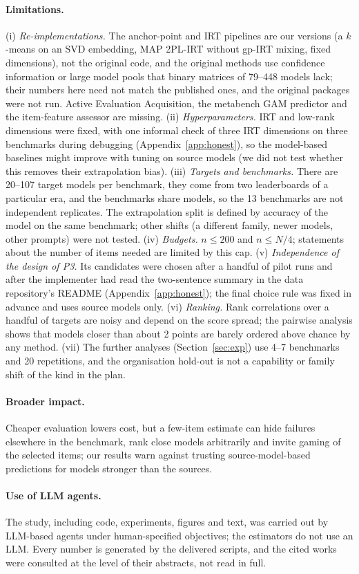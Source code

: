 \paragraph{Limitations.}
(i) \emph{Re-implementations.} The anchor-point and IRT pipelines are our versions (a $k$-means on an SVD embedding, MAP 2PL-IRT without gp-IRT mixing, fixed dimensions), not the original code, and the original methods use confidence information or large model pools that binary matrices of 79--448 models lack; their numbers here need not match the published ones, and the original packages were not run. Active Evaluation Acquisition, the metabench GAM predictor and the item-feature assessor are missing. (ii) \emph{Hyperparameters.} IRT and low-rank dimensions were fixed, with one informal check of three IRT dimensions on three benchmarks during debugging (Appendix~\ref{app:honest}), so the model-based baselines might improve with tuning on source models (we did not test whether this removes their extrapolation bias). (iii) \emph{Targets and benchmarks.} There are 20--107 target models per benchmark, they come from two leaderboards of a particular era, and the benchmarks share models, so the 13 benchmarks are not independent replicates. The extrapolation split is defined by accuracy of the model on the same benchmark; other shifts (a different family, newer models, other prompts) were not tested. (iv) \emph{Budgets.} $n\le200$ and $n\le N/4$; statements about the number of items needed are limited by this cap. (v) \emph{Independence of the design of P3.} Its candidates were chosen after a handful of pilot runs and after the implementer had read the two-sentence summary in the data repository's README (Appendix~\ref{app:honest}); the final choice rule was fixed in advance and uses source models only. (vi) \emph{Ranking.} Rank correlations over a handful of targets are noisy and depend on the score spread; the pairwise analysis shows that models closer than about 2 points are barely ordered above chance by any method. (vii) The further analyses (Section~\ref{sec:exp}) use 4--7 benchmarks and 20 repetitions, and the organisation hold-out is not a capability or family shift of the kind in the plan.

\paragraph{Broader impact.}
Cheaper evaluation lowers cost, but a few-item estimate can hide failures elsewhere in the benchmark, rank close models arbitrarily and invite gaming of the selected items; our results warn against trusting source-model-based predictions for models stronger than the sources.

\paragraph{Use of LLM agents.}
The study, including code, experiments, figures and text, was carried out by LLM-based agents under human-specified objectives; the estimators do not use an LLM. Every number is generated by the delivered scripts, and the cited works were consulted at the level of their abstracts, not read in full.
